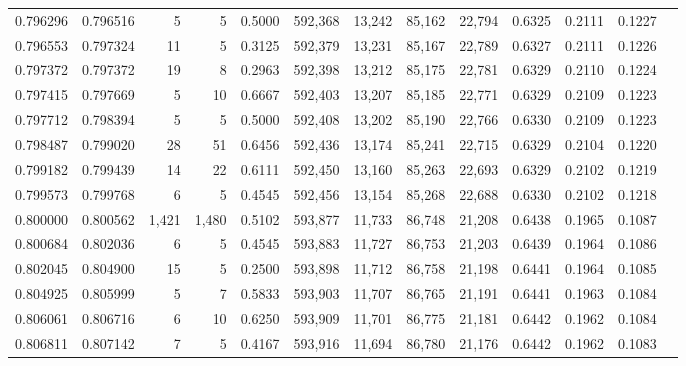 \begin{tabular}{rrrrrrrrrrrrr}
0.796296 & 0.796516 &      5 &     5 &                                     0.5000 & 592,368 &  13,242 &  85,162 &  22,794 & 0.6325 & 0.2111 & 0.1227 \\
0.796553 & 0.797324 &     11 &     5 &                                     0.3125 & 592,379 &  13,231 &  85,167 &  22,789 & 0.6327 & 0.2111 & 0.1226 \\
0.797372 & 0.797372 &     19 &     8 &                                     0.2963 & 592,398 &  13,212 &  85,175 &  22,781 & 0.6329 & 0.2110 & 0.1224 \\
0.797415 & 0.797669 &      5 &    10 &                                     0.6667 & 592,403 &  13,207 &  85,185 &  22,771 & 0.6329 & 0.2109 & 0.1223 \\
0.797712 & 0.798394 &      5 &     5 &                                     0.5000 & 592,408 &  13,202 &  85,190 &  22,766 & 0.6330 & 0.2109 & 0.1223 \\
0.798487 & 0.799020 &     28 &    51 &                                     0.6456 & 592,436 &  13,174 &  85,241 &  22,715 & 0.6329 & 0.2104 & 0.1220 \\
0.799182 & 0.799439 &     14 &    22 &                                     0.6111 & 592,450 &  13,160 &  85,263 &  22,693 & 0.6329 & 0.2102 & 0.1219 \\
0.799573 & 0.799768 &      6 &     5 &                                     0.4545 & 592,456 &  13,154 &  85,268 &  22,688 & 0.6330 & 0.2102 & 0.1218 \\
0.800000 & 0.800562 &  1,421 & 1,480 &                                     0.5102 & 593,877 &  11,733 &  86,748 &  21,208 & 0.6438 & 0.1965 & 0.1087 \\
0.800684 & 0.802036 &      6 &     5 &                                     0.4545 & 593,883 &  11,727 &  86,753 &  21,203 & 0.6439 & 0.1964 & 0.1086 \\
0.802045 & 0.804900 &     15 &     5 &                                     0.2500 & 593,898 &  11,712 &  86,758 &  21,198 & 0.6441 & 0.1964 & 0.1085 \\
0.804925 & 0.805999 &      5 &     7 &                                     0.5833 & 593,903 &  11,707 &  86,765 &  21,191 & 0.6441 & 0.1963 & 0.1084 \\
0.806061 & 0.806716 &      6 &    10 &                                     0.6250 & 593,909 &  11,701 &  86,775 &  21,181 & 0.6442 & 0.1962 & 0.1084 \\
0.806811 & 0.807142 &      7 &     5 &                                     0.4167 & 593,916 &  11,694 &  86,780 &  21,176 & 0.6442 & 0.1962 & 0.1083 \\

\end{tabular}
